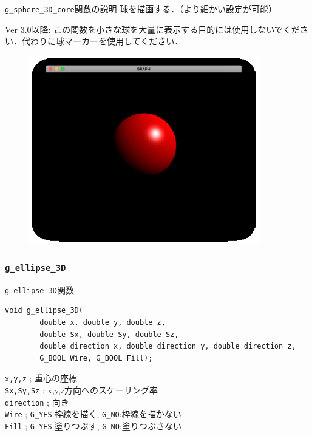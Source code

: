 \documentclass[platex,a4paper,12pt]{jsarticle}%
\begin{document}
\begin{itembox}[l]{\texttt{g\_sphere\_3D\_core}関数の説明}
球を描画する．（より細かい設定が可能）

Ver 3.0以降: この関数を小さな球を大量に表示する目的には使用しないでください．代わりに球マーカーを使用してください．
\end{itembox}

\begin{figure}[htb]
\centering
\includegraphics[width=100mm]{Canvas_g_sphere_SDL.eps}
\end{figure}




\clearpage
\subsubsection{\texttt{g\_ellipse\_3D}}

\begin{itembox}[l]{\texttt{g\_ellipse\_3D}関数}
\begin{verbatim}
void g_ellipse_3D(
        double x, double y, double z,
        double Sx, double Sy, double Sz,
        double direction_x, double direction_y, double direction_z,
        G_BOOL Wire, G_BOOL Fill);
\end{verbatim}
\verb|x,y,z| ; 重心の座標\\
\verb|Sx,Sy,Sz| ; x,y,z方向へのスケーリング率\\
\verb|direction| ; 向き\\
\verb|Wire| ; \verb|G_YES|:枠線を描く, \verb|G_NO|:枠線を描かない \\
\verb|Fill| ; \verb|G_YES|:塗りつぶす, \verb|G_NO|:塗りつぶさない
\end{itembox}
\end{document}
